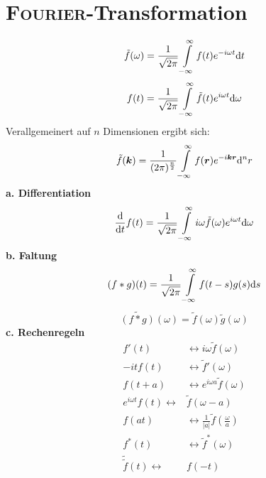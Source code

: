 \section{\textsc{Fourier}-Transformation}
\begin{equation*}
\tilde{f}(\omega)=\frac{1}{\sqrt{2\pi}}\int\limits_{-\infty}^{\infty} f(t)e^{-i\omega t} \mathrm{d} t
\end{equation*}
\begin{equation*}
f(t)=\frac{1}{\sqrt{2\pi}}\int\limits_{-\infty}^{\infty} \tilde{f}(t)e^{i\omega t} \mathrm{d} \omega
\end{equation*}
Verallgemeinert auf $n$ Dimensionen ergibt sich:\\
\begin{equation*}
\tilde{f}(\bm{k})=\frac{1}{({2\pi})^{\frac{n}{2}}}\int\limits_{-\infty}^{\infty} f(\bm{r})e^{-i\bm{k}\bm{r}} \mathrm{d} ^nr
\end{equation*}
\linebreak
\textbf{a. Differentiation}\\
\begin{equation*}
\frac{\mathrm{d}{}}{\mathrm{d}{t}}f(t)=\frac{1}{\sqrt{2\pi}}\int\limits_{-\infty}^{\infty} i\omega\tilde{f}(\omega)e^{i\omega t} \mathrm{d} \omega
\end{equation*}
\linebreak
\textbf{b. Faltung}\\
\begin{equation*}
(f*g)(t)=\frac{1}{\sqrt{2\pi}}\int\limits_{-\infty}^{\infty} f(t-s)g(s) \mathrm{d} s
\end{equation*}
\begin{equation*}
\widetilde{(f*g)}(\omega)=\tilde{f}(\omega)\tilde{g}(\omega)
\end{equation*}
\textbf{c. Rechenregeln}\\
\begin{align*}
f'(t) & \leftrightarrow i\omega\tilde{f}(\omega)\\
-itf(t) & \leftrightarrow \tilde{f}'(\omega)\\
f(t+a) & \leftrightarrow  e^{i\omega a}\tilde{f}(\omega)\\
e^{i\omega t}f(t) \leftrightarrow & \tilde{f}(\omega-a)\\
f(at) & \leftrightarrow \frac{1}{|a|}\tilde{f}\left(\frac{\omega}{a}\right)\\
f^*(t) & \leftrightarrow \tilde{f}^*(\omega)\\
\tilde{\tilde{f}}(t) \leftrightarrow & f(-t)\\
\end{align*}


